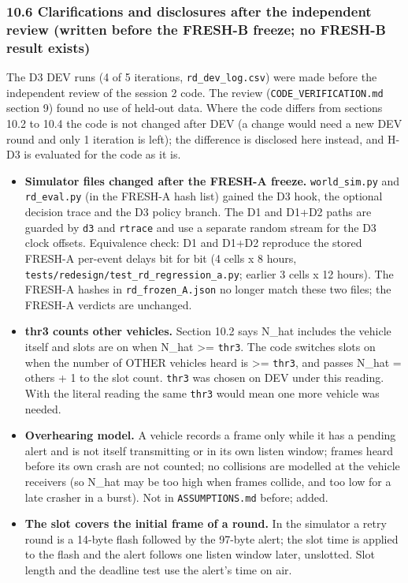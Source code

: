 \subsubsection*{10.6 Clarifications and disclosures after the independent review (written before the FRESH-B freeze; no FRESH-B result exists)}
The D3 DEV runs (4 of 5 iterations, \texttt{rd\_dev\_log.csv}) were made before the independent review of the session 2 code. The review (\texttt{CODE\_VERIFICATION.md} section 9) found no use of held-out data. Where the code differs from sections 10.2 to 10.4 the code is not changed after DEV (a change would need a new DEV round and only 1 iteration is left); the difference is disclosed here instead, and H-D3 is evaluated for the code as it is.
\begin{itemize}
\item \textbf{Simulator files changed after the FRESH-A freeze.} \texttt{world\_sim.py} and \texttt{rd\_eval.py} (in the FRESH-A hash list) gained the D3 hook, the optional decision trace and the D3 policy branch. The D1 and D1+D2 paths are guarded by \texttt{d3} and \texttt{rtrace} and use a separate random stream for the D3 clock offsets. Equivalence check: D1 and D1+D2 reproduce the stored FRESH-A per-event delays bit for bit (4 cells x 8 hours, \texttt{tests/redesign/test\_rd\_regression\_a.py}; earlier 3 cells x 12 hours). The FRESH-A hashes in \texttt{rd\_frozen\_A.json} no longer match these two files; the FRESH-A verdicts are unchanged.
\item \textbf{thr3 counts other vehicles.} Section 10.2 says N\_hat includes the vehicle itself and slots are on when N\_hat >= \texttt{thr3}. The code switches slots on when the number of OTHER vehicles heard is >= \texttt{thr3}, and passes N\_hat = others + 1 to the slot count. \texttt{thr3} was chosen on DEV under this reading. With the literal reading the same \texttt{thr3} would mean one more vehicle was needed.
\item \textbf{Overhearing model.} A vehicle records a frame only while it has a pending alert and is not itself transmitting or in its own listen window; frames heard before its own crash are not counted; no collisions are modelled at the vehicle receivers (so N\_hat may be too high when frames collide, and too low for a late crasher in a burst). Not in \texttt{ASSUMPTIONS.md} before; added.
\item \textbf{The slot covers the initial frame of a round.} In the simulator a retry round is a 14-byte flash followed by the 97-byte alert; the slot time is applied to the flash and the alert follows one listen window later, unslotted. Slot length and the deadline test use the alert's time on air.

\end{itemize}
